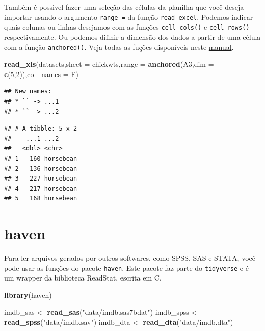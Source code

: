 \documentclass[
]{book}
\newenvironment{Shaded}{\begin{snugshade}}{\end{snugshade}}
\newcommand{\DataTypeTok}[1]{\textcolor[rgb]{0.13,0.29,0.53}{#1}}
\newcommand{\DecValTok}[1]{\textcolor[rgb]{0.00,0.00,0.81}{#1}}
\newcommand{\KeywordTok}[1]{\textcolor[rgb]{0.13,0.29,0.53}{\textbf{#1}}}
\newcommand{\NormalTok}[1]{#1}
\newcommand{\StringTok}[1]{\textcolor[rgb]{0.31,0.60,0.02}{#1}}
\begin{document}
Também é possivel fazer uma seleção das células da planilha que você deseja importar usando o argumento \texttt{range\ =} da função \texttt{read\_excel}. Podemos indicar quais colunas ou linhas desejamos com as funções \texttt{cell\_cols()} e \texttt{cell\_rows()} respectivamente. Ou podemos difinir a dimensão dos dados a partir de uma célula com a função \texttt{anchored()}. Veja todas as fuções disponíveis neste \href{https://cran.r-project.org/web/packages/cellranger/cellranger.pdf}{manual}.

\begin{Shaded}
\begin{Highlighting}[]
\KeywordTok{read\_xls}\NormalTok{(datasets,}\DataTypeTok{sheet =} \StringTok{\textquotesingle{}chickwts\textquotesingle{}}\NormalTok{,}\DataTypeTok{range =} \KeywordTok{anchored}\NormalTok{(}\StringTok{\textquotesingle{}A3\textquotesingle{}}\NormalTok{,}\DataTypeTok{dim =} \KeywordTok{c}\NormalTok{(}\DecValTok{5}\NormalTok{,}\DecValTok{2}\NormalTok{)),}\DataTypeTok{col\_names =}\NormalTok{ F)}
\end{Highlighting}
\end{Shaded}

\begin{verbatim}
## New names:
## * `` -> ...1
## * `` -> ...2
\end{verbatim}

\begin{verbatim}
## # A tibble: 5 x 2
##    ...1 ...2     
##   <dbl> <chr>    
## 1   160 horsebean
## 2   136 horsebean
## 3   227 horsebean
## 4   217 horsebean
## 5   168 horsebean
\end{verbatim}

\hypertarget{haven}{%
\section{haven}\label{haven}}

Para ler arquivos gerados por outros softwares, como SPSS, SAS e STATA, você pode usar as funções do pacote \texttt{haven}. Este pacote faz parte do \texttt{tidyverse} e é um wrapper da biblioteca ReadStat, escrita em C.

\begin{Shaded}
\begin{Highlighting}[]
\KeywordTok{library}\NormalTok{(haven)}

\NormalTok{imdb\_sas <{-}}\StringTok{ }\KeywordTok{read\_sas}\NormalTok{(}\StringTok{"data/imdb.sas7bdat"}\NormalTok{)}
\NormalTok{imdb\_spss <{-}}\StringTok{ }\KeywordTok{read\_spss}\NormalTok{(}\StringTok{"data/imdb.sav"}\NormalTok{)}
\NormalTok{imdb\_dta <{-}}\StringTok{ }\KeywordTok{read\_dta}\NormalTok{(}\StringTok{"data/imdb.dta"}\NormalTok{)}
\end{Highlighting}
\end{Shaded}
\end{document}
